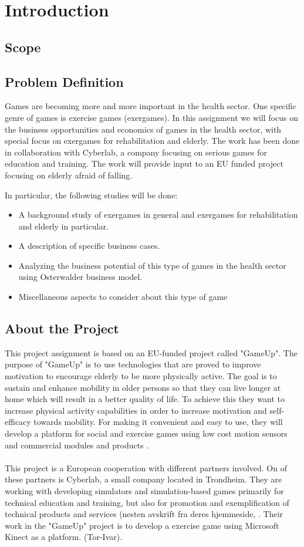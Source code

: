 \chapter{Introduction}
\section{Scope}
\section{Problem Definition}
Games are becoming more and more important in the health sector. One specific genre of games is exercise games (exergames). In this assignment we will focus on the business opportunities and economics of games in the health sector, with special focus on exergames for rehabilitation and elderly. The work has been done in collaboration with Cyberlab, a company focusing on serious games for education and training. The work will provide input to an EU funded project focusing on elderly afraid of falling.

In particular, the following studies will be done: 
\begin{itemize}
\renewcommand{\labelitemi}{$\bullet$}
\item A background study of exergames in general and exergames for rehabilitation and elderly in particular.
\item	A description of specific business cases.
\item	Analyzing the business potential of this type of games in the health sector using Osterwalder business model.
\item	Miscellaneous aspects to consider about this type of game
\end{itemize}

\section{About the Project}
This project assignment is based on an EU-funded project called "GameUp". The purpose of "GameUp" is to use technologies that are proved to improve motivation to encourage elderly to be more physically active. The goal is to sustain and enhance mobility in older persons so that they can live longer at home which will result in a better quality of life. To achieve this they want to increase physical activity capabilities in order to increase motivation and self-efficacy towards mobility. For making it convenient and easy to use, they will develop a platform for social and exercise games using low cost motion sensors and commercial modules and products \cite{gameup}.\\ \\ This project is a European cooperation with different partners involved. On of these partners is Cyberlab, a small company located in Trondheim. They are working with developing simulators and simulation-based games primarily for technical education and training, but also for promotion and exemplification of technical products and services (nesten avskrift fra deres hjemmeside, \cite{cyberlab}. Their work in the "GameUp" project is to develop a exercise game using Microsoft Kinect as a platform. (Tor-Ivar).

